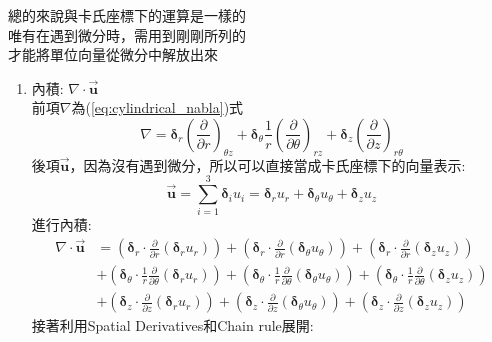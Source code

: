 \documentclass[../main.tex]{subfiles}
\begin{document}
\begin{itemize}
\begin{itemize}
      總的來說與卡氏座標下的運算是一樣的\\
      唯有在遇到微分時，需用到剛剛所列的\\
      才能將單位向量從微分中解放出來
      \begin{enumerate}
        \item 內積: $\nabla \cdot \vec{\bm u}$\\
          前項$\nabla$為(\ref{eq:cylindrical_nabla})式
          \begin{equation}
            \nabla = \bm\delta_r \left(\frac{\partial}{\partial r}\right)_{\theta z} +
              \bm\delta_\theta \frac{1}{r}\left(\frac{\partial}{\partial \theta}\right)_{rz} +
              \bm\delta_z \left(\frac{\partial}{\partial z}\right)_{r\theta}
          \end{equation}
          後項$\vec{\bm u}$，因為沒有遇到微分，所以可以直接當成卡氏座標下的向量表示:
          \begin{equation}
            \vec{\bm u} = \sum_{i=1}^3 \bm\delta_i u_i = \bm\delta_r u_r + \bm\delta_\theta u_\theta + \bm\delta_z u_z
          \end{equation}
          進行內積:
          \begin{align}
            \nabla \cdot \vec{\bm u} &= \left(\bm\delta_r \cdot \frac{\partial}{\partial r}\left(\bm\delta_r u_r\right)\right)
            + \left(\bm\delta_r \cdot \frac{\partial}{\partial r}\left(\bm\delta_\theta u_\theta\right)\right)
            + \left(\bm\delta_r \cdot \frac{\partial}{\partial r}\left(\bm\delta_z u_z\right)\right) \nonumber\\
            &+ \left(\bm\delta_\theta \cdot \frac{1}{r}\frac{\partial}{\partial \theta}\left(\bm\delta_r u_r\right)\right)
            + \left(\bm\delta_\theta \cdot \frac{1}{r}\frac{\partial}{\partial \theta}\left(\bm\delta_\theta u_\theta\right)\right)
            + \left(\bm\delta_\theta \cdot \frac{1}{r}\frac{\partial}{\partial \theta}\left(\bm\delta_z u_z\right)\right) \nonumber\\
            &+ \left(\bm\delta_z \cdot \frac{\partial}{\partial z}\left(\bm\delta_r u_r\right)\right)
            + \left(\bm\delta_z \cdot \frac{\partial}{\partial z}\left(\bm\delta_\theta u_\theta\right)\right)
            + \left(\bm\delta_z \cdot \frac{\partial}{\partial z}\left(\bm\delta_z u_z\right)\right)
          \end{align}
          接著利用Spatial Derivatives和Chain rule展開:
          \begin{align}

\end{align}
\end{enumerate}
\end{itemize}
\end{itemize}
\end{document}
